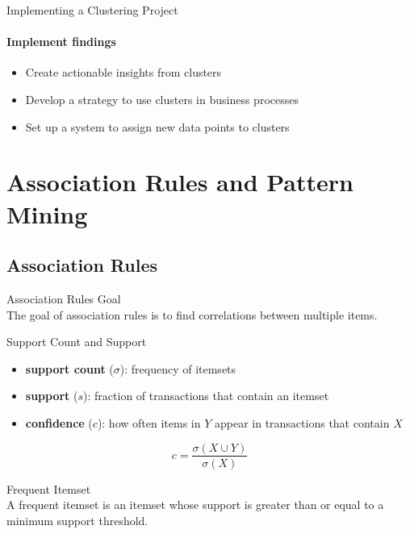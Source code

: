 \begin{KR}{Implementing a Clustering Project}
\paragraph{Implement findings}
\begin{itemize}
    \item Create actionable insights from clusters
    \item Develop a strategy to use clusters in business processes
    \item Set up a system to assign new data points to clusters
\end{itemize}
\end{KR}


\raggedcolumns
\pagebreak

\section{Association Rules and Pattern Mining}

\subsection{Association Rules}


\begin{definition}{Association Rules Goal}\\
The goal of association rules is to find correlations between multiple items.
\end{definition}


\begin{definition}{Support Count and Support}
\begin{itemize}
    \item \textbf{support count} ($\sigma$): frequency of itemsets
    \item \textbf{support} ($s$): fraction of transactions that contain an itemset
    \item \textbf{confidence} ($c$): how often items in $Y$ appear in transactions that contain $X$
\end{itemize}

$$c = \frac{\sigma(X \cup Y)}{\sigma(X)}$$
\end{definition}



\begin{definition}{Frequent Itemset}\\
A frequent itemset is an itemset whose support is greater than or equal to a minimum support threshold.
\end{definition}


